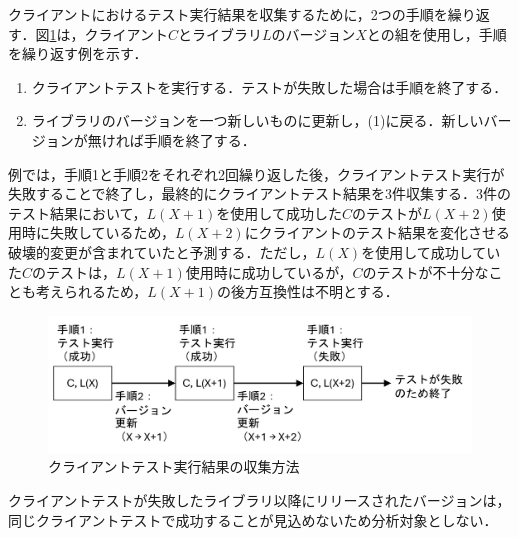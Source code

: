\documentclass[submit]{ipsj}
\begin{document}
クライアントにおけるテスト実行結果を収集するために，2つの手順を繰り返す．図\ref{fig:experimentExample}は，クライアント$C$とライブラリ$L$のバージョン$X$との組を使用し，手順を繰り返す例を示す．
\begin{enumerate}
  \item クライアントテストを実行する．テストが失敗した場合は手順を終了する．
  \item ライブラリのバージョンを一つ新しいものに更新し，(1)に戻る．新しいバージョンが無ければ手順を終了する．
\end{enumerate}
例では，手順1と手順2をそれぞれ2回繰り返した後，クライアントテスト実行が失敗することで終了し，最終的にクライアントテスト結果を3件収集する．3件のテスト結果において，$L(X+1)$を使用して成功した$C$のテストが$L(X+2)$使用時に失敗しているため，$L(X+2)$にクライアントのテスト結果を変化させる破壊的変更が含まれていたと予測する．ただし，$L(X)$を使用して成功していた$C$のテストは，$L(X+1)$使用時に成功しているが，$C$のテストが不十分なことも考えられるため，$L(X+1)$の後方互換性は不明とする．






\begin{figure}[t]
  \centering
  \includegraphics[width=1\linewidth]{IPSJjournal_maekawa_fig/experiment-example1.pdf}
  \caption{クライアントテスト実行結果の収集方法}
  \label{fig:experimentExample}
  \vspace{-4mm}
\end{figure}

クライアントテストが失敗したライブラリ以降にリリースされたバージョンは，同じクライアントテストで成功することが見込めないため分析対象としない．
\end{document}
